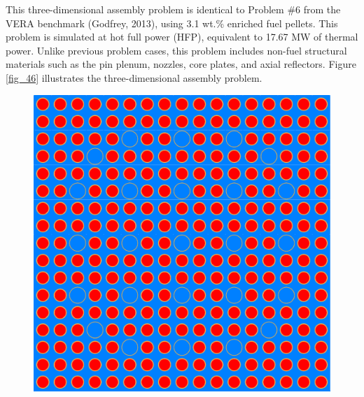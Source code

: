 This three-dimensional assembly problem is identical to Problem \#6 from the VERA benchmark (Godfrey, 2013), using 3.1 wt.\% enriched fuel pellets. This problem is simulated at hot full power (HFP), equivalent to 17.67 MW of thermal power. Unlike previous problem cases, this problem includes non-fuel structural materials such as the pin plenum, nozzles, core plates, and axial reflectors. Figure \ref{fig_46} illustrates the three-dimensional assembly problem.

\begin{figure}
    \centering
    \begin{minipage}{.4\textwidth}
      \centering
      \includegraphics[width=\textwidth]{figs/radial.pdf}
    \end{minipage}%
    \hspace{10em}
    \begin{minipage}{.15\textwidth}
      \centering

\end{minipage}
\end{figure}
